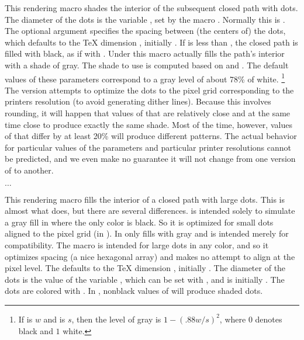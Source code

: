 \documentclass[letterpaper]{article}
\begin{document}
This rendering macro shades the interior of the subsequent closed path
with dots. The diameter of the dots is the \MF{} variable ,
set by the macro . Normally this is
\dim{0.5bp}. The optional argument specifies the spacing between (the
centers of) the dots, which defaults to the \TeX{} dimension
, initially \dim{1pt}. If  is less than
, the closed path is filled with black, as if with
. Under \MP{} this macro actually fills the path's interior
with a shade of gray. The shade to use is computed based on
 and . The default values of these
parameters correspond to a gray level of about 78\% of white.%
    \footnote{If  is $w$ and  is $s$, then
    the level of gray is $1 - (.88w/s)^2$, where $0$ denotes black and
    $1$ white.} %
The \MF{} version attempts to optimize the dots to the pixel grid
corresponding to the printers resolution (to avoid generating dither
lines). Because this involves rounding, it will happen that values of
 that are relatively close and at the same time close to
 produce exactly the same shade. Most of the time, however,
values of  that differ by at least 20\% will produce
different patterns. The actual behavior for particular values of the
parameters and particular printer resolutions cannot be predicted, and
we even make no guarantee it will not change from one version of \mfp{}
to another.

\begin{cd}
$\ldots$%
\end{cd}

This rendering macro fills the interior of a closed path with large
dots. This is almost what  does, but there are several
differences.  is intended solely to simulate a gray fill in
\MF{} where the only color is black. So it is optimized for small dots
aligned to the pixel grid (in \MF{}). In \MP{}  only fills with
gray and is intended merely for compatibility. The macro 
is intended for large dots in any color, and so it optimizes spacing (a
nice hexagonal array) and makes no attempt to align at the pixel level.
The  defaults to the \TeX{} dimension ,
initially \dim{10pt}. The diameter of the dots is the value of the \MF{}
variable , which can be set with
, and is initially \dim{5bp}. The dots
are colored with . In
\MF{}, nonblack values of  will produce shaded dots.
\end{document}
